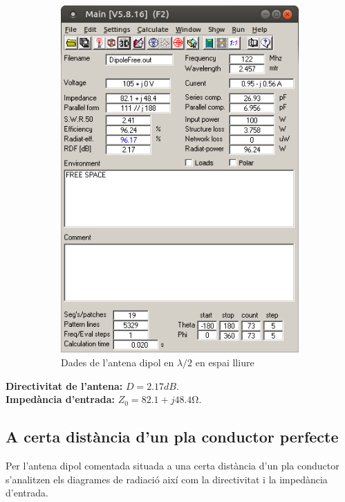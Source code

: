 \begin{figure}[H]
\begin{subfigure}[b]{0.32\textwidth}
	  \includegraphics[width=\textwidth]{./images/1.Dypole_Free/1_menu.png}
	  \caption{Dades de l'antena dipol en $\lambda/2$ en espai lliure}
	  \label{1menu}
	  \end{subfigure}
	  \vspace{10pt}
	\caption{}
	\label{diag2}
	\end{figure}

	\textbf{Directivitat de l'antena:} $ D=2.17 dB$. \\
	\textbf{Impedància d'entrada:} $ Z_0=82.1+j48.4 \si{\ohm}$.


 \subsection{A certa distància d’un pla conductor perfecte}

  Per l'antena dipol comentada situada a una certa distància d'un pla conductor s'analitzen els diagrames de radiació així com la directivitat i la impedància d'entrada. 

